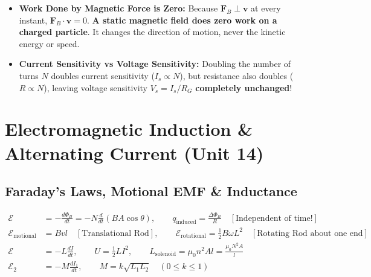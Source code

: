 \documentclass[11pt,a4paper]{article}
\begin{document}
\begin{trapbox}
\begin{itemize}
  \item \textbf{Work Done by Magnetic Force is Zero:} Because $\mathbf{F}_B \perp \mathbf{v}$ at every instant, $\mathbf{F}_B\cdot\mathbf{v} = 0$. \textbf{A static magnetic field does zero work on a charged particle}. It changes the direction of motion, never the kinetic energy or speed.
  \item \textbf{Current Sensitivity vs Voltage Sensitivity:} Doubling the number of turns $N$ doubles current sensitivity ($I_s \propto N$), but resistance also doubles ($R \propto N$), leaving voltage sensitivity $V_s = I_s / R_G$ \textbf{completely unchanged}!
\end{itemize}
\end{trapbox}

\newpage

\section{Electromagnetic Induction \& Alternating Current (Unit 14)}

\subsection{Faraday's Laws, Motional EMF \& Inductance}

\begin{formulabox}
\begin{align}
  \mathcal{E} &= -\frac{d\Phi_B}{dt} = -N\frac{d}{dt}(B A\cos\theta), \qquad q_{\text{induced}} = \frac{\Delta\Phi_B}{R} \quad [\text{Independent of time!}] \\
  \mathcal{E}_{\text{motional}} &= B v l \quad [\text{Translational Rod}], \qquad \mathcal{E}_{\text{rotational}} = \frac{1}{2}B\omega L^2 \quad [\text{Rotating Rod about one end}] \\
  \mathcal{E} &= -L\frac{dI}{dt}, \qquad U = \frac{1}{2}L I^2, \qquad L_{\text{solenoid}} = \mu_0 n^2 A l = \frac{\mu_0 N^2 A}{l} \\
  \mathcal{E}_2 &= -M\frac{dI_1}{dt}, \qquad M = k\sqrt{L_1 L_2} \quad (0 \le k \le 1)
\end{align}
\end{formulabox}
\end{document}
